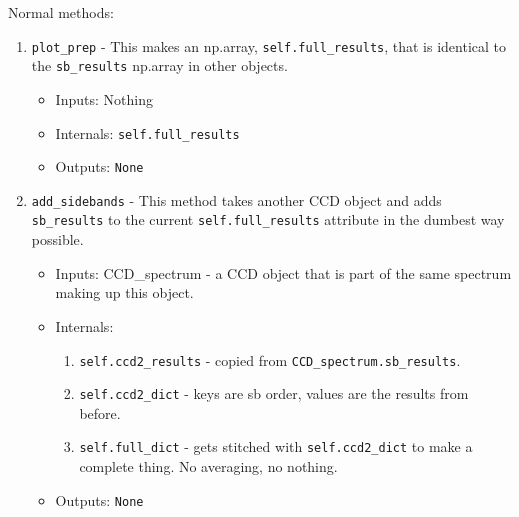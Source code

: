 \documentclass{article}
\newcommand{\code}{\texttt}
\begin{document}
\noindent Normal methods:
\begin{enumerate}
	\item \code{plot\_prep} - This makes an np.array, \code{self.full\_results}, that is identical to the \code{sb\_results} np.array in other objects.
	\begin{itemize}
		\item Inputs: Nothing
		\item Internals: \code{self.full\_results}
		\item Outputs: \code{None}
	\end{itemize}
	
	\item \code{add\_sidebands} - This method takes another CCD object and adds \code{sb\_results} to the current \code{self.full\_results} attribute in the dumbest way possible.
	\begin{itemize}
		\item Inputs: CCD\_spectrum - a CCD object that is part of the same spectrum making up this object.
		\item Internals:
		\begin{enumerate}
			\item \code{self.ccd2\_results} - copied from \code{CCD\_spectrum.sb\_results}.
			\item \code{self.ccd2\_dict} - keys are sb order, values are the results from before.
			\item \code{self.full\_dict} - gets stitched with \code{self.ccd2\_dict} to make a complete thing.  No averaging, no nothing.
		\end{enumerate}
		\item Outputs: \code{None}
	\end{itemize}
	

\end{enumerate}
\end{document}
